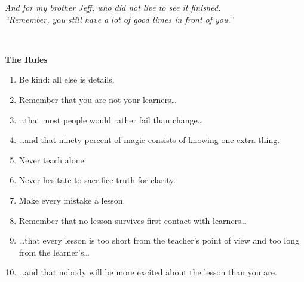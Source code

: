 \begin{center}
{\em
And for my brother Jeff, who did not live to see it finished.\\
``Remember, you still have a lot of good times in front of you.''
}
\end{center}

\newpage

\pagestyle{empty}

~

\newpage

\pagestyle{empty}

\vspace*{6\baselineskip}

\begin{center}{\large \textbf{The Rules}}\end{center}

\begin{enumerate}

\item Be kind: all else is details.

\item Remember that you are not your learners{\ldots}

\item {\ldots}that most people would rather fail than change{\ldots}

\item {\ldots}and that ninety percent of magic consists of knowing one extra thing.

\item Never teach alone.

\item Never hesitate to sacrifice truth for clarity.

\item Make every mistake a lesson.

\item Remember that no lesson survives first contact with learners{\ldots}

\item {\ldots}that every lesson is too short from the teacher's point of view and too long from the learner's{\ldots}

\item {\ldots}and that nobody will be more excited about the lesson than you are.

\end{enumerate}

\newpage

\pagestyle{empty}

~

\newpage

\tableofcontents

\newpage

\pagestyle{empty}

~

\newpage

\pagestyle{plain}
